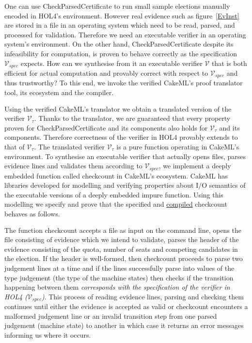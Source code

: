 \documentclass[10pt,conference]{IEEEtran}
\begin{document}
One can use Check\textunderscore{}Parsed\textunderscore{}Certificate to run small sample elections manually encoded in HOL4's environment. However real evidence such as figure~\ref{EvInst} are stored in a file in an operating system which need to be read, parsed, and processed for validation. Therefore we need an executable verifier in an operating system's environment. On the other hand, Check\textunderscore{}Parsed\textunderscore{}Certificate despite its infeasibility for computation, is proven to behave correctly as the specification $\mathcal{V}_{spec}$ expects. How can we synthesise from it an executable verifier $\mathcal{V}$ that is both efficient for actual computation and provably correct with respect to $\mathcal{V}_{spec}$ and thus trustworthy? To this end, we invoke the verified CakeML's proof translator tool, its ecosystem and the compiler.

Using the verified CakeML's translator we obtain a translated version of the verifier $\mathcal{V}_{\tau}$. Thanks to the translator, we are guaranteed that every property proven for  
 Check\textunderscore{}Parsed\textunderscore{}Certificate and its components also holds for $\mathcal{V}_{\tau}$ and its components. Therefore correctness of the verifier in HOL4 provably extends to that of $\mathcal{V}_{\tau}$. The translated verifier $\mathcal{V}_{\tau}$ is a pure function operating in CakeML's environment. To synthesise an executable verifier that actually opens files, parses evidence lines and validates them according to $\mathcal{V}_{spec}$, we implement a deeply embedded function called check\textunderscore{}count in CakeML's ecosystem.  CakeML has  libraries developed for modelling and verifying properties about I/O semantics of the executable versions  of a deeply embedded impure function.  Using this modelling we specify and prove that the specified and \underline{compiled} check\textunderscore{}count behaves as follows. 
 
 The function check\textunderscore{}count accepts a file as input on the command line, opens the file consisting of  evidence which we intend to validate, parses the header of the evidence consisting of the quota, number of seats and competing candidates in the election. If the header is well-formed, then check\textunderscore{}count proceeds to parse two judgement lines at a time and if the lines  successfully parse into  values of the type judgement (the type of the machine states) then checks if  the transition happening between them \emph{corresponds with the specification of the verifier in HOL4 ($\mathcal{V}_{spec}$)}. This process of reading evidence lines, parsing and checking them continues until either the evidence is accepted as valid or  check\textunderscore{}count encounters a malformed judgement line or an invalid transition step from one parsed judgement (machine state) to another  in which case it returns an error messages  informing us where it occurs.  
 
\end{document}
